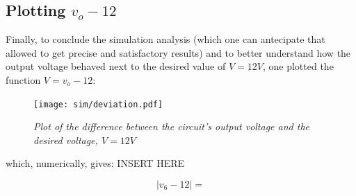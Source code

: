 \subsection{Plotting $v_o - 12$}
Finally, to conclude the simulation analysis (which one can antecipate that allowed to get precise and satisfactory results) and to better understand how the output voltage behaved next to the desired value of $V = 12V$, one plotted the function $V = v_o - 12$:

\vspace{-140px}
\begin{figure}[H]
    \centering
    \texttt{[image: sim/deviation.pdf]}
    \vspace*{-10mm}
        \caption{\textit{Plot of the difference between the circuit's output voltage and the desired voltage, $V=12V$}}
    \label{fig:dev}
\end{figure}

which, numerically, gives: INSERT HERE

\begin{equation}
    |v_6 - 12| = 
\end{equation}
